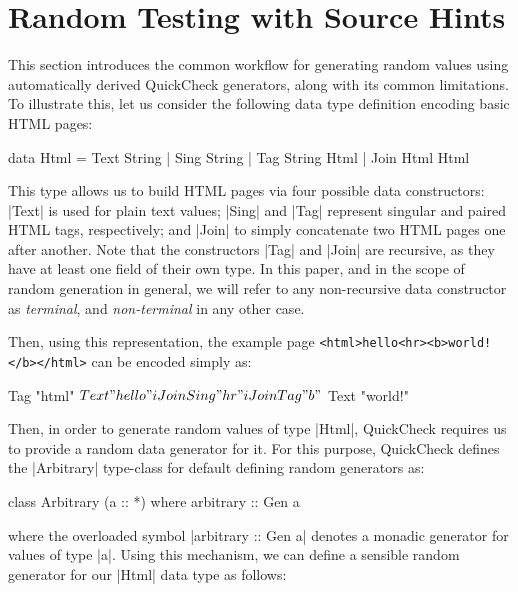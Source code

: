 \section{Random Testing with Source Hints}
\label{sec:sources}

%
This section introduces the common workflow for generating random values using
automatically derived QuickCheck generators, along with its common limitations.
%
To illustrate this, let us consider the following data type definition encoding
basic HTML pages:

\begin{code}
data Html
  =  Text  String
  |  Sing  String
  |  Tag   String Html
  |  Join  Html Html
\end{code}

This type allows us to build HTML pages via four possible data constructors:
|Text| is used for plain text values; |Sing| and |Tag| represent singular and
paired HTML tags, respectively; and |Join| to simply concatenate two HTML pages
one after another.
%
Note that the constructors |Tag| and |Join| are recursive, as they have at least
one field of their own type.
%
In this paper, and in the scope of random generation in general, we will refer
to any non-recursive data constructor as \emph{terminal}, and
\emph{non-terminal} in any other case.


Then, using this representation, the example page\linebreak
%
\texttt{<html>hello<hr><b>world!</b></html>}
%
can be encoded simply as:
%
\begin{code}
Tag "html" $  Text "hello"
              iJoin Sing "hr"
              iJoin Tag "b" $ Text "world!"
\end{code} %

%
Then, in order to generate random values of type |Html|, QuickCheck requires us
to provide a random data generator for it.
%
For this purpose, QuickCheck defines the |Arbitrary| type-class for default
defining random generators as:

\begin{code}
class Arbitrary (a :: *) where
  arbitrary :: Gen a
\end{code}
%
where the overloaded symbol |arbitrary :: Gen a| denotes a monadic generator for
values of type |a|.
%
Using this mechanism, we can define a sensible random generator for our |Html|
data type as follows:

